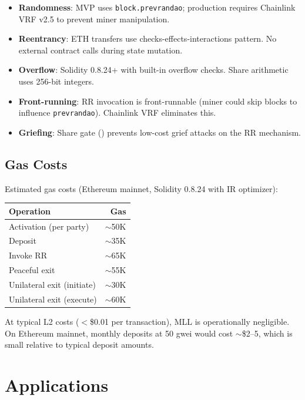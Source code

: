 \documentclass[12pt,a4paper]{article}
\begin{document}
\begin{itemize}
\item \textbf{Randomness}: MVP uses \texttt{block.prevrandao}; production requires Chainlink VRF v2.5 to prevent miner manipulation.
\item \textbf{Reentrancy}: ETH transfers use checks-effects-interactions pattern. No external contract calls during state mutation.
\item \textbf{Overflow}: Solidity 0.8.24+ with built-in overflow checks. Share arithmetic uses 256-bit integers.
\item \textbf{Front-running}: RR invocation is front-runnable (miner could skip blocks to influence \texttt{prevrandao}). Chainlink VRF eliminates this.
\item \textbf{Griefing}: Share gate () prevents low-cost grief attacks on the RR mechanism.
\end{itemize}

\subsection{Gas Costs}

Estimated gas costs (Ethereum mainnet, Solidity 0.8.24 with IR optimizer):
\begin{center}
\begin{tabular}{lr}
\toprule
\textbf{Operation} & \textbf{Gas} \\
\midrule
Activation (per party) & $\sim$50K \\
Deposit & $\sim$35K \\
Invoke RR & $\sim$65K \\
Peaceful exit & $\sim$55K \\
Unilateral exit (initiate) & $\sim$30K \\
Unilateral exit (execute) & $\sim$60K \\
\bottomrule
\end{tabular}
\end{center}

At typical L2 costs ($<$\$0.01 per transaction), MLL is operationally negligible. On Ethereum mainnet, monthly deposits at 50 gwei would cost $\sim$\$2--5, which is small relative to typical deposit amounts.



\section{Applications}
\label{sec:applications}
\end{document}
